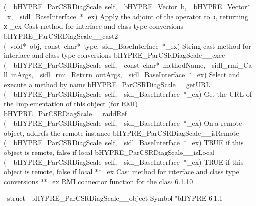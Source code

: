 \documentclass{article}
\begin{document}
\begin{cxxentry}
\begin{cxxentry}
\begin{cxxnames}
        {(\ \ bHYPRE\_ParCSRDiagScale\ self,\ \ bHYPRE\_Vector\ b,\ \ bHYPRE\_Vector*\ x,\ \ sidl\_BaseInterface\ *\_ex)}
        {
Apply the adjoint of the operator to {\tt b}, returning {\tt x}}
        {}
\label{cxx.6.1.28}
        {\_ex}
        {}
        {
Cast method for interface and class type conversions}
        {}
\label{cxx.6.1.29}
        {bHYPRE\_ParCSRDiagScale\_\_cast2}
        {(\ void*\ obj,\ const\ char*\ type,\ sidl\_BaseInterface\ *\_ex)}
        {
String cast method for interface and class type conversions}
        {}
\label{cxx.6.1.30}
        {bHYPRE\_ParCSRDiagScale\_\_exec}
        {(\ \ bHYPRE\_ParCSRDiagScale\ self,\ \ const\ char*\ methodName,\ \ sidl\_rmi\_Call\ inArgs,\ \ sidl\_rmi\_Return\ outArgs,\ \ sidl\_BaseInterface\ *\_ex)}
        {
Select and execute a method by name}
        {}
\label{cxx.6.1.31}
        {bHYPRE\_ParCSRDiagScale\_\_getURL}
        {(\ \ bHYPRE\_ParCSRDiagScale\ self,\ \ sidl\_BaseInterface\ *\_ex)}
        {
Get the URL of the Implementation of this object (for RMI)}
        {}
\label{cxx.6.1.32}
        {bHYPRE\_ParCSRDiagScale\_\_raddRef}
        {(\ \ bHYPRE\_ParCSRDiagScale\ self,\ \ sidl\_BaseInterface\ *\_ex)}
        {
On a remote object, addrefs the remote instance}
        {}
\label{cxx.6.1.33}
        {bHYPRE\_ParCSRDiagScale\_\_isRemote}
        {(\ \ bHYPRE\_ParCSRDiagScale\ self,\ \ sidl\_BaseInterface\ *\_ex)}
        {
TRUE if this object is remote, false if local}
        {}
\label{cxx.6.1.34}
        {bHYPRE\_ParCSRDiagScale\_\_isLocal}
        {(\ \ bHYPRE\_ParCSRDiagScale\ self,\ \ sidl\_BaseInterface\ *\_ex)}
        {
TRUE if this object is remote, false if local}
        {}
\label{cxx.6.1.35}
        {**\_ex}
        {}
        {
Cast method for interface and class type conversions}
        {}
\label{cxx.6.1.36}
        {**\_ex}
        {}
        {
RMI connector function for the class}
        {6.1.10}
\end{cxxnames}
\begin{cxxvariable}
{\ struct\ }
        {bHYPRE\_ParCSRDiagScale\_\_object}
        {}
        {
Symbol "bHYPRE}
        {6.1.1}
\begin{cxxdoc}


\end{cxxdoc}
\end{cxxvariable}
\end{cxxentry}
\end{cxxentry}
\end{document}
